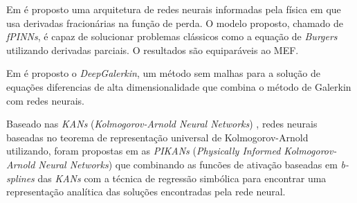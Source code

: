 Em \cite{pang-etal:2019-fPINNs} é proposto uma arquitetura de redes neurais 
informadas pela física em que usa derivadas fracionárias na função de perda.
O modelo proposto, chamado de \textit{fPINNs}, é capaz de solucionar problemas 
clássicos como a equação de \textit{Burgers} utilizando derivadas parciais. 
O resultados são equiparáveis ao MEF.

Em \cite{sirignano-spiliopoulos:2018-deepgalerkin} é proposto o 
\textit{DeepGalerkin}, um método sem malhas para a solução de equações
diferencias de alta dimensionalidade que combina o método de Galerkin com
redes neurais. 

Baseado nas \textit{KANs} (\textit{Kolmogorov-Arnold Neural Networks})
\cite{liu-etal:2025-kans}, redes neurais baseadas no teorema de representação 
universal de Kolmogorov-Arnold utilizando, foram propostas em as 
\textit{PIKANs} (\textit{Physically Informed Kolmogorov-Arnold Neural Networks})
que combinando as funcões de ativação baseadas em \textit{b-splines} das
\textit{KANs} com a técnica de regressão simbólica para encontrar uma 
representação analítica das soluções encontradas pela rede neural.
